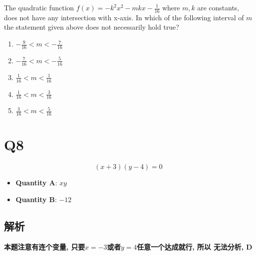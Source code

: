   The quadratic function $ f\left( x \right) = -k^{2}x^{2} - mkx - \frac{1}{16} $
  where $ m, k $ are constants, does not have any intersection with x-axis.
  In which of the following interval of $ m $ the statement given above
  does not necessarily hold true?

  \begin{enumerate}
    \item $ - \frac{9}{16} < m < - \frac{7}{16} $
    \item $ - \frac{7}{16} < m < - \frac{5}{16} $
    \item $ \frac{1}{16} < m < \frac{1}{16} $
    \item $ \frac{1}{16} < m < \frac{3}{16} $
    \item $ \frac{3}{16} < m < \frac{5}{16} $
  \end{enumerate}

\section{Q8}

  \begin{equation*}
    \left( x + 3 \right) \left( y - 4 \right) = 0
  \end{equation*}

  \begin{itemize}
    \item \textbf{Quantity A}: $ x y $
    \item \textbf{Quantity B}: $ - 12 $
  \end{itemize}

  \subsection{解析}

    \textbf{本题注意有连个变量, 只要$ x = -3 $或者$ y = 4 $任意一个达成就行, 所以
    无法分析, D}

